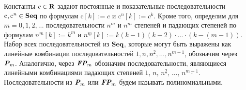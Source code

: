 Константы $c \in \text{\bfseries R}$ задают постоянные и показательные последовательности $\text{c}, \text{c}^n \in \text{\bfseries Seq}$ по формулам $\text{c}[k] := c$ и $\text{c}^n[k] := c^k$. Кроме того, определим для $m = 0,1,2,\ldots$ последовательности $n^m$ и $n^{\underline{m}}$ степеней и падающих степеней по формулам $n^m[k] := k^m$ и $n^{\underline{m}}[k] := k(k-1)(k-2)\cdot \ldots \cdot (k-(m-1)).$ Набор всех последовательностей из $\text{\bfseries Seq}$, которые могут быть выражены как линейные комбинации последовательностей $1, n, n^2, \ldots, n^{m-1}$, обозначим через $\text{\bfseries\itshape P}_m$. Аналогично, через $\text{\bfseries\itshape FP}_m$ обозначим последовательности, являющиеся линейными комбинациями падающих степеней $1$, $n$, $n^{\underline{2}}$, $\ldots$, $n^{\underline{m-1}}$. Последовательности из $\text{\bfseries\itshape P}_m$ или $\text{\bfseries\itshape FP}_m$ будем называть полиномиальными.

